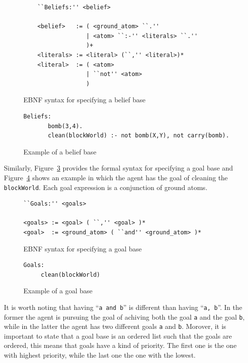\documentclass[a4paper]{article}
\begin{document}
\begin{figure}[htp]
\begin{verbatim}
	``Beliefs:'' <belief>
	
	<belief>   := ( <ground_atom> ``.''
	              | <atom> ``:-'' <literals> ``.'' 
	              )+
	<literals> := <literal> (``,'' <literal>)*
	<literal>  := ( <atom> 
	              | ``not'' <atom>
	              )
	\end{verbatim}
\caption{EBNF syntax for specifying a belief base}
\label{fig:ebnf_agent}
\end{figure}

\begin{figure}[htp]
\begin{verbatim}
Beliefs:
       bomb(3,4).
       clean(blockWorld) :- not bomb(X,Y), not carry(bomb).
\end{verbatim}
\caption{Example of a belief base}
\label{fig:example_beliefbase}
\end{figure}

Similarly, Figure~\ref{fig:ebnf_goalbase} provides the formal syntax for specifying a goal base and Figure~\ref{fig:example_goalbase} shows an example in which the agent has the goal of cleaning the \texttt{blockWorld}. Each goal expression is a conjunction of ground atoms. 

\begin{figure}[htp]
\begin{verbatim}
``Goals:'' <goals>

<goals> := <goal> ( ``,'' <goal> )*
<goal>  := <ground_atom> ( ``and'' <ground_atom> )*
\end{verbatim}
\caption{EBNF syntax for specifying a goal base}
\label{fig:ebnf_goalbase}
\end{figure}

\begin{figure}[htp]
\begin{verbatim}
Goals:
     clean(blockWorld)
\end{verbatim}
\caption{Example of a goal base}
\label{fig:example_goalbase}
\end{figure}

It is worth noting that having ``\texttt{a and b}'' is different than having ``\texttt{a, b}''. In the former the agent is pursuing the goal of achiving both the goal \texttt{a} and the goal \texttt{b}, while in the latter the agent has two different goals \texttt{a} and \texttt{b}. Morover, it is important to state that a goal base is an ordered list such that the goals are ordered, this means that goals have a kind of priority. The first one is the one with highest priority, while the last one the one with the lowest.
\end{document}
